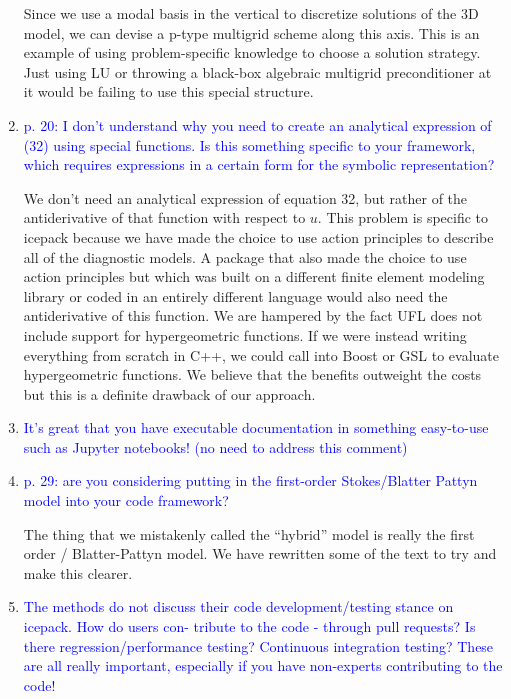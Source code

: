 \documentclass{article}
\theoremstyle{definition}
\theoremstyle{plain}
\begin{document}
\begin{enumerate}
Since we use a modal basis in the vertical to discretize solutions of the 3D model, we can devise a p-type multigrid scheme along this axis.
This is an example of using problem-specific knowledge to choose a solution strategy.
Just using LU or throwing a black-box algebraic multigrid preconditioner at it would be failing to use this special structure.

\item \textcolor{blue}{p. 20: I don't understand why you need to create an analytical expression of (32) using special
functions. Is this something specific to your framework, which requires expressions in a certain form
for the symbolic representation?}

We don't need an analytical expression of equation 32, but rather of the antiderivative of that function with respect to $u$.
This problem is specific to icepack because we have made the choice to use action principles to describe all of the diagnostic models.
A package that also made the choice to use action principles but which was built on a different finite element modeling library or coded in an entirely different language would also need the antiderivative of this function.
We are hampered by the fact UFL does not include support for hypergeometric functions.
If we were instead writing everything from scratch in C++, we could call into Boost or GSL to evaluate hypergeometric functions.
We believe that the benefits outweight the costs but this is a definite drawback of our approach.

\item \textcolor{blue}{It's great that you have executable documentation in something easy-to-use such as Jupyter notebooks! (no need to address this comment)}
\item \textcolor{blue}{p. 29: are you considering putting in the first-order Stokes/Blatter Pattyn model into your code
framework?}

The thing that we mistakenly called the ``hybrid'' model is really the first order / Blatter-Pattyn model.
We have rewritten some of the text to try and make this clearer.

\item \textcolor{blue}{The methods do not discuss their code development/testing stance on icepack. How do users con-
tribute to the code - through pull requests? Is there regression/performance testing? Continuous
integration testing? These are all really important, especially if you have non-experts contributing
to the code!}
\end{enumerate}
\end{document}
